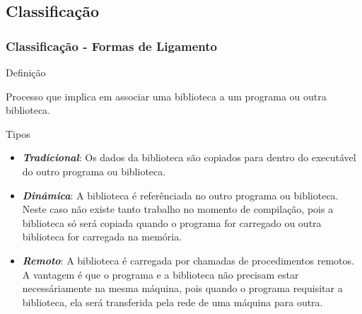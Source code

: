  \subsection{Classificação}
\begin{frame}
 \frametitle{Classificação - Formas de Ligamento}
 
 \begin{block}{Definição}  
 
  Processo que implica em associar uma biblioteca a um programa ou outra biblioteca.
  
 \end{block}

 \begin{block}{Tipos}  
 
  \begin{itemize}
  
   \item \emph{\textbf{Tradicional}}: Os dados da biblioteca são copiados para dentro do executável do outro programa
   ou biblioteca.
   
   \item \emph{\textbf{Dinâmica}}: A biblioteca é referênciada no outro programa ou biblioteca. Neste caso não existe 
   tanto trabalho no momento de compilação, pois a biblioteca só será copiada quando o programa for carregado ou outra
   biblioteca for carregada na memória.
   
   \item \emph{\textbf{Remoto}}: A biblioteca é carregada por chamadas de procedimentos remotos. A vantagem é que o
   programa e a biblioteca não precisam estar necessáriamente na mesma máquina, pois quando o programa requisitar 
   a biblioteca, ela será transferida pela rede de uma máquina para outra.
   
  \end{itemize}

 \end{block}
 
\end{frame}

